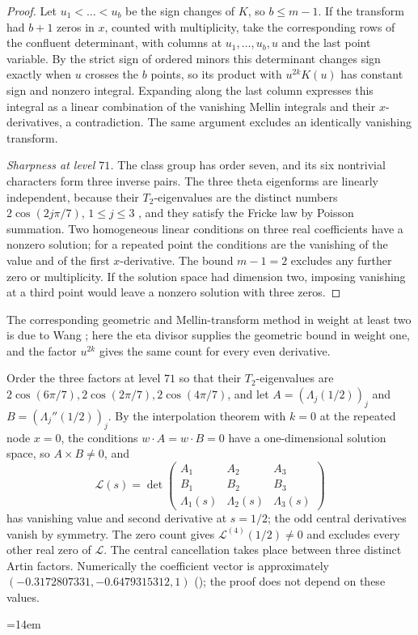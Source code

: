 \begin{proof}
Let $u_1<\dots<u_b$ be the sign changes of $K$, so $b\le m-1$. If the transform had $b+1$ zeros in $x$,
counted with multiplicity, take the corresponding rows of the confluent determinant, with columns at
$u_1,\dots,u_b,u$ and the last point variable. By the strict sign of ordered minors this determinant
changes sign exactly when $u$ crosses the $b$ points, so its product with $u^{2k}K(u)$ has constant sign
and nonzero integral. Expanding along the last column expresses this integral as a linear combination of
the vanishing Mellin integrals and their $x$-derivatives, a contradiction. The same argument excludes an
identically vanishing transform.

\emph{Sharpness at level $71$.}
The class group has order seven, and its six nontrivial characters form three inverse pairs. The three
theta eigenforms are linearly independent, because their $T_2$-eigenvalues are the distinct numbers
$2\cos(2j\pi/7)$, $1\le j\le3$ \cite{BerkovichPatane2013Binary}, and they satisfy the Fricke law by Poisson
summation. Two homogeneous linear conditions on three real coefficients have a nonzero solution; for a
repeated point the conditions are the vanishing of the value and of the first $x$-derivative. The bound
$m-1=2$ excludes any further zero or multiplicity. If the solution space had dimension two, imposing
vanishing at a third point would leave a nonzero solution with three zeros.
\end{proof}

The corresponding geometric and Mellin-transform method in weight at least two is due to Wang
\cite{Wang2026Modular}; here the eta divisor supplies the geometric bound in weight one, and the factor
$u^{2k}$ gives the same count for every even derivative.

\begin{example}\label{hec:ex:fourth}
Order the three factors at level $71$ so that their $T_2$-eigenvalues are
$2\cos(6\pi/7),2\cos(2\pi/7),2\cos(4\pi/7)$, and let $A=(\Lambda_j(1/2))_j$ and
$B=(\Lambda_j''(1/2))_j$. By the interpolation theorem with $k=0$ at the repeated node $x=0$, the
conditions $w\cdot A=w\cdot B=0$ have a one-dimensional solution space, so $A\times B\ne0$, and
\[
 \mathcal L(s)=\det\begin{pmatrix}A_1&A_2&A_3\\ B_1&B_2&B_3\\
 \Lambda_1(s)&\Lambda_2(s)&\Lambda_3(s)\end{pmatrix}
\]
has vanishing value and second derivative at $s=1/2$; the odd central derivatives vanish by symmetry. The
zero count gives $\mathcal L^{(4)}(1/2)\ne0$ and excludes every other real zero of $\mathcal L$. The
central cancellation takes place between three distinct Artin factors. Numerically the coefficient vector
is approximately $(-0.3172807331,-0.6479315312,1)$ (); the proof
does not depend on these values.
{\emergencystretch=14em\par}
\end{example}


